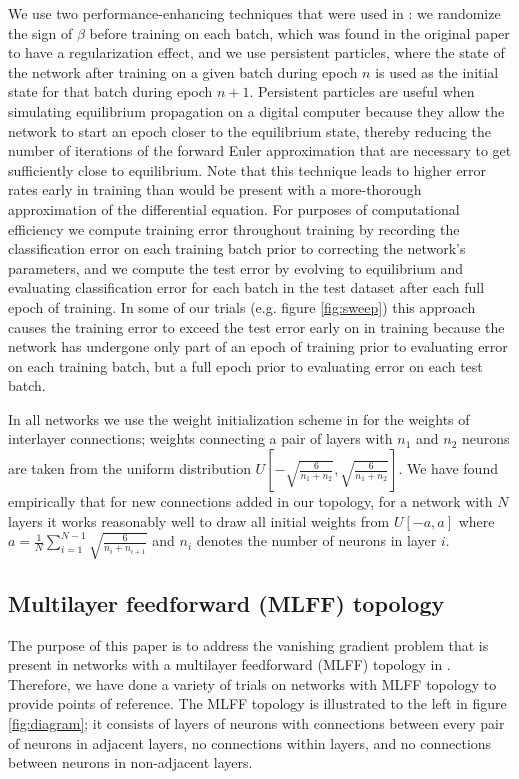 \documentclass[utf8]{frontiersSCNS}
\begin{document}
We use two performance-enhancing techniques that were used in \citep{scellier17}: we randomize the sign of $\beta$ before training on each batch, which was found in the original paper to have a regularization effect, and we use persistent particles, where the state of the network after training on a given batch during epoch $n$ is used as the initial state for that batch during epoch $n+1$. Persistent particles are useful when simulating equilibrium propagation on a digital computer because they allow the network to start an epoch closer to the equilibrium state, thereby reducing the number of iterations of the forward Euler approximation that are necessary to get sufficiently close to equilibrium. Note that this technique leads to higher error rates early in training than would be present with a more-thorough approximation of the differential equation. For purposes of computational efficiency we compute training error throughout training by recording the classification error on each training batch prior to correcting the network's parameters, and we compute the test error by evolving to equilibrium and evaluating classification error for each batch in the test dataset after each full epoch of training. In some of our trials (e.g. figure \ref{fig:sweep}) this approach causes the training error to exceed the test error early on in training because the network has undergone only part of an epoch of training prior to evaluating error on each training batch, but a full epoch prior to evaluating error on each test batch.

In all networks we use the weight initialization scheme in \citep{glorot2010} for the weights of interlayer connections; weights connecting a pair of layers with $n_1$ and $n_2$ neurons are taken from the uniform distribution $U[-\sqrt{\frac{6}{n_1+n_2}}, \sqrt{\frac{6}{n_1+n_2}}]$. We have found empirically that for new connections added in our topology, for a network with $N$ layers it works reasonably well to draw all initial weights from $U[-a,a]$ where $a=\frac{1}{N}\sum_{i=1}^{N-1}\sqrt{\frac{6}{n_i+n_{i+1}}}$ and $n_i$ denotes the number of neurons in layer $i$.

\subsection{Multilayer feedforward (MLFF) topology}\label{sec:mlff_top}

The purpose of this paper is to address the vanishing gradient problem that is present in networks with a multilayer feedforward (MLFF) topology in \citep{scellier17}. Therefore, we have done a variety of trials on networks with MLFF topology to provide points of reference. The MLFF topology is illustrated to the left in figure \ref{fig:diagram}; it consists of layers of neurons with connections between every pair of neurons in adjacent layers, no connections within layers, and no connections between neurons in non-adjacent layers.
\end{document}

